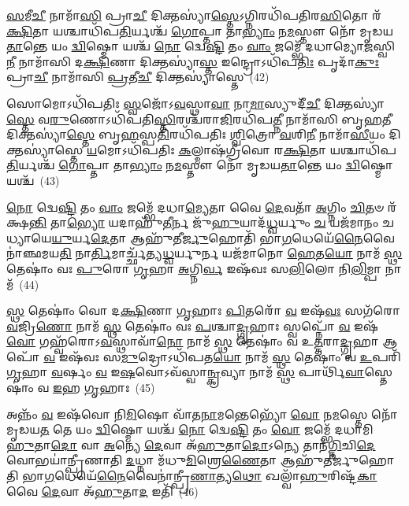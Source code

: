 {\anuvakamend[{\-\ul{𑌦𑍁}\-𑌧𑍍𑌰\-\ul{𑌸𑍍𑌤}\-𑌨𑍂𑌰𑍍\mbox{}\-\ul{𑌹}\-𑌵𑌿𑌰𑍍𑌭𑌾᳴𑌗𑌾𑌃 𑌪𑌾\-\ul{𑌤𑍁} 𑌦𑍍𑌵𑌾𑌤𑍍𑌰𑌿𑍞᳴𑌶𑌚𑍍𑌚}]}%

\-\ul{𑌸}\-𑌮𑍀\-\ul{𑌚𑍀} 𑌨𑌾𑌮𑌾᳴\-\ul{𑌸𑌿} 𑌪𑍍𑌰𑌾\-\ul{𑌚𑍀} 𑌦𑌿𑌕𑍍𑌤𑌸𑍍𑌯𑌾॑\-\ul{𑌸𑍍𑌤𑍇}\-\-𑌽𑌗𑍍𑌨𑌿𑌰𑌧𑌿᳴𑌪𑌤𑌿𑌰\-\ul{𑌸𑌿}\-𑌤𑍋 𑌰᳴\-\ul{𑌕𑍍𑌷𑌿}\-𑌤𑌾 𑌯𑌶𑍍𑌚𑌾𑌧𑌿᳴𑌪\-\ul{𑌤𑌿}\-𑌰𑍍𑌯𑌶𑍍𑌚᳴ \ul{𑌗𑍋}\-𑌪𑍍𑌤𑌾 𑌤𑌾\-\ul{𑌭𑍍𑌯𑌾𑌂} 𑌨\-\ul{𑌮}\-𑌸𑍍𑌤𑍗 𑌨𑍋᳴ 𑌮𑍃𑌡𑌯\-\ul{𑌤𑌾}\-𑌨𑍍𑌤𑍇 𑌯𑌂 \ul{𑌦𑍍𑌵𑌿}\-𑌷𑍍𑌮𑍋 𑌯𑌶𑍍𑌚᳴ \ul{𑌨𑍋} 𑌦𑍍𑌵𑍇\-\ul{𑌷𑍍𑌟𑌿} 𑌤𑌂 \ul{𑌵𑌾𑌂} 𑌜𑌮𑍍𑌭𑍇᳴ 𑌦𑌧𑌾𑌮𑍍𑌯𑍋\-\ul{𑌜}\-𑌸𑍍𑌵𑌿\-\ul{𑌨𑍀} 𑌨𑌾𑌮𑌾᳴𑌸𑌿 𑌦\-\ul{𑌕𑍍𑌷𑌿}\-𑌣𑌾 𑌦𑌿𑌕𑍍𑌤𑌸𑍍𑌯𑌾॑\-\ul{𑌸𑍍𑌤} 𑌇𑌨𑍍𑌦𑍍𑌰𑍋\-𑌽𑌧𑌿᳴𑌪\-\ul{𑌤𑌿𑌃} 𑌪𑍃𑌦𑌾᳴\-\ul{𑌕𑍁𑌃} 𑌪𑍍𑌰𑌾\-\ul{𑌚𑍀} 𑌨𑌾𑌮𑌾᳴𑌸𑌿 \ul{𑌪𑍍𑌰}\-𑌤𑍀\-\ul{𑌚𑍀} 𑌦𑌿𑌕𑍍𑌤𑌸𑍍𑌯𑌾॑𑌸𑍍𑌤𑍇~(42)

𑌸𑍋𑌮𑍋\-𑌽𑌧𑌿᳴𑌪𑌤𑌿𑌃 \ul{𑌸𑍍𑌵}\-𑌜𑍋᳴\-𑌽\-\ul{𑌵}\-𑌸𑍍𑌥𑌾\-\ul{𑌵𑌾} 𑌨𑌾\-\ul{𑌮𑌾}\-𑌸𑍍𑌯𑍁𑌦𑍀᳴\-\ul{𑌚𑍀} 𑌦𑌿𑌕𑍍𑌤𑌸𑍍𑌯𑌾॑\-\ul{𑌸𑍍𑌤𑍇} 𑌵\-\ul{𑌰𑍁}\-𑌣𑍋\-𑌽𑌧𑌿᳴𑌪𑌤𑌿\-\ul{𑌸𑍍𑌤𑌿}\-𑌰𑌶𑍍𑌚᳴𑌰𑌾\-\ul{𑌜𑌿}\-𑌰𑌧𑌿᳴𑌪\-\ul{𑌤𑍍𑌨𑍀} 𑌨𑌾𑌮𑌾᳴𑌸𑌿 𑌬𑍃\-\ul{𑌹}\-𑌤𑍀 𑌦𑌿𑌕𑍍𑌤𑌸𑍍𑌯𑌾॑\-\ul{𑌸𑍍𑌤𑍇} 𑌬𑍃\-\ul{𑌹}\-𑌸𑍍𑌪\-\ul{𑌤𑌿}\-𑌰𑌧𑌿᳴𑌪𑌤𑌿𑌃 \ul{𑌶𑍍𑌵𑌿}\-𑌤𑍍𑌰𑍋 \ul{𑌵}\-𑌶𑌿\-\ul{𑌨𑍀} 𑌨𑌾𑌮𑌾᳴\-\ul{𑌸𑍀}\-𑌯𑌂 𑌦𑌿𑌕𑍍𑌤𑌸𑍍𑌯𑌾॑𑌸𑍍𑌤𑍇 \ul{𑌯}\-𑌮𑍋\-𑌽𑌧𑌿᳴𑌪𑌤𑌿𑌃 \ul{𑌕}\-𑌲𑍍𑌮𑌾𑌷᳴𑌗𑍍𑌰𑍀𑌵𑍋 𑌰\-\ul{𑌕𑍍𑌷𑌿}\-𑌤𑌾 𑌯𑌶𑍍𑌚𑌾𑌧𑌿᳴𑌪\-\ul{𑌤𑌿}\-𑌰𑍍𑌯𑌶𑍍𑌚᳴ \ul{𑌗𑍋}\-𑌪𑍍𑌤𑌾 𑌤𑌾\-\ul{𑌭𑍍𑌯𑌾𑌂} 𑌨\-\ul{𑌮}\-𑌸𑍍𑌤𑍗 𑌨𑍋᳴ 𑌮𑍃𑌡𑌯\-\ul{𑌤𑌾}\-𑌨𑍍𑌤𑍇 𑌯𑌂 \ul{𑌦𑍍𑌵𑌿}\-𑌷𑍍𑌮𑍋 𑌯𑌶𑍍𑌚᳴~(43)

\-\ul{𑌨𑍋} 𑌦𑍍𑌵𑍇\-\ul{𑌷𑍍𑌟𑌿} 𑌤𑌂 \ul{𑌵𑌾𑌂} 𑌜𑌮𑍍𑌭𑍇᳴ 𑌦𑌧𑌾\-\ul{𑌮𑍍𑌯𑍇}\-𑌤𑌾 𑌵𑍈 \ul{𑌦𑍇}\-𑌵𑌤𑌾᳴ \ul{𑌅}\-𑌗𑍍𑌨𑌿𑌂 \ul{𑌚𑌿}\-𑌤𑍞 𑌰᳴𑌕𑍍𑌷\-\ul{𑌨𑍍𑌤𑌿} 𑌤𑌾\-\ul{𑌭𑍍𑌯𑍋} 𑌯𑌦𑌾𑌹𑍁᳴\-\ul{𑌤𑍀}\-𑌰𑍍𑌨 𑌜𑍁᳴\-\ul{𑌹𑍁}\-𑌯𑌾𑌦᳴\-\ul{𑌧𑍍𑌵}\-𑌰𑍍𑌯𑍁𑌂 \ul{𑌚} 𑌯𑌜᳴𑌮𑌾𑌨𑌂 𑌚 𑌧𑍍𑌯𑌾𑌯𑍇\-\ul{𑌯𑍁}\-𑌰𑍍𑌯\-\ul{𑌦𑍇}\-𑌤𑌾 𑌆𑌹𑍁᳴𑌤𑍀\-\ul{𑌰𑍍𑌜𑍁}\-𑌹𑍋𑌤𑌿᳴ 𑌭𑌾\-\ul{𑌗}\-𑌧𑍇𑌯𑍇᳴\-\ul{𑌨𑍈}\-𑌵𑍈𑌨𑌾॑𑌞𑍍𑌛𑌮𑌯\-\ul{𑌤𑌿} 𑌨𑌾\-\ul{𑌰𑍍𑌤𑌿}\-𑌮𑌾𑌰𑍍𑌚𑍍𑌛᳴𑌤𑍍𑌯\-\ul{𑌧𑍍𑌵}\-𑌰𑍍𑌯𑍁𑌰𑍍𑌨 𑌯𑌜᳴𑌮𑌾𑌨𑍋 \ul{𑌹𑍇}\-𑌤\-\ul{𑌯𑍋} 𑌨𑌾𑌮᳴ \ul{𑌸𑍍𑌥} 𑌤𑍇𑌷𑌾𑌂॑ 𑌵𑌃 \ul{𑌪𑍁}\-𑌰𑍋 \ul{𑌗𑍃}\-𑌹𑌾 \ul{𑌅}\-𑌗𑍍𑌨𑌿\-\ul{𑌰𑍍𑌵} 𑌇𑌷᳴𑌵𑌃 𑌸\-\ul{𑌲𑌿}\-𑌲𑍋 𑌨𑌿\-\ul{𑌲𑌿}\-𑌮𑍍𑌪𑌾 𑌨𑌾𑌮᳴~(44)

\-\ul{𑌸𑍍𑌥} 𑌤𑍇𑌷𑌾𑌂॑ 𑌵𑍋 𑌦\-\ul{𑌕𑍍𑌷𑌿}\-𑌣𑌾 \ul{𑌗𑍃}\-𑌹𑌾𑌃 \ul{𑌪𑌿}\-𑌤𑌰𑍋᳴ \ul{𑌵} 𑌇𑌷᳴\-\ul{𑌵𑌃} 𑌸𑌗᳴𑌰𑍋 \ul{𑌵}\-𑌜𑍍𑌰𑌿\-\ul{𑌣𑍋} 𑌨𑌾𑌮᳴ \ul{𑌸𑍍𑌥} 𑌤𑍇𑌷𑌾𑌂॑ 𑌵𑌃 \ul{𑌪}\-𑌶𑍍𑌚𑌾\-\ul{𑌦𑍍𑌗𑍃}\-𑌹𑌾𑌃 𑌸𑍍𑌵𑌪𑍍𑌨𑍋᳴ \ul{𑌵} 𑌇𑌷᳴\-\ul{𑌵𑍋} 𑌗𑌹𑍍𑌵᳴𑌰𑍋\-𑌽\-\ul{𑌵}\-𑌸𑍍𑌥𑌾𑌵𑌾᳴\-\ul{𑌨𑍋} 𑌨𑌾𑌮᳴ \ul{𑌸𑍍𑌥} 𑌤𑍇𑌷𑌾𑌂॑ 𑌵 𑌉\-\ul{𑌤𑍍𑌤}\-𑌰𑌾\-\ul{𑌦𑍍𑌗𑍃}\-𑌹𑌾 𑌆𑌪𑍋᳴ \ul{𑌵} 𑌇𑌷᳴𑌵𑌃 𑌸\-\ul{𑌮𑍁}\-𑌦𑍍𑌰𑍋\-𑌽𑌧𑌿᳴𑌪𑌤\-\ul{𑌯𑍋} 𑌨𑌾𑌮᳴ \ul{𑌸𑍍𑌥} 𑌤𑍇𑌷𑌾𑌂॑ 𑌵 \ul{𑌉}\-𑌪𑌰𑌿᳴ \ul{𑌗𑍃}\-𑌹𑌾 \ul{𑌵}\-𑌰𑍍\mbox{}𑌷𑌂 \ul{𑌵} 𑌇\-\ul{𑌷}\-𑌵𑍋\-𑌽𑌵᳴𑌸𑍍𑌵𑌾\-\ul{𑌨𑍍𑌕𑍍𑌰}\-𑌵𑍍𑌯𑌾 𑌨𑌾𑌮᳴ \ul{𑌸𑍍𑌥} 𑌪𑌾𑌰𑍍𑌥𑌿᳴\-\ul{𑌵𑌾}\-𑌸𑍍𑌤𑍇𑌷𑌾𑌂॑ 𑌵 \ul{𑌇}\-𑌹 \ul{𑌗𑍃}\-𑌹𑌾𑌃~(45)

𑌅𑌨𑍍𑌨𑌂᳴ \ul{𑌵} 𑌇𑌷᳴𑌵𑍋 𑌨𑌿\-\ul{𑌮𑌿}\-𑌷𑍋 𑌵𑌾᳴𑌤\-\ul{𑌨𑌾}\-𑌮𑌨𑍍𑌤𑍇𑌭𑍍𑌯𑍋᳴ \ul{𑌵𑍋} 𑌨\-\ul{𑌮}\-𑌸𑍍𑌤𑍇 𑌨𑍋᳴ 𑌮𑍃𑌡𑌯\-\ul{𑌤} 𑌤𑍇 𑌯𑌂 \ul{𑌦𑍍𑌵𑌿}\-𑌷𑍍𑌮𑍋 𑌯𑌶𑍍𑌚᳴ \ul{𑌨𑍋} 𑌦𑍍𑌵𑍇\-\ul{𑌷𑍍𑌟𑌿} 𑌤𑌂 \ul{𑌵𑍋} 𑌜𑌮𑍍𑌭𑍇᳴ 𑌦𑌧𑌾𑌮𑌿 \ul{𑌹𑍁}\-𑌤𑌾\-\ul{𑌦𑍋} 𑌵𑌾 \ul{𑌅}\-𑌨𑍍𑌯𑍇 \ul{𑌦𑍇}\-𑌵𑌾 𑌅᳴\-\ul{𑌹𑍁}\-𑌤𑌾\-\ul{𑌦𑍋}\-\-𑌽𑌨𑍍𑌯𑍇 𑌤𑌾𑌨᳴\-\ul{𑌗𑍍𑌨𑌿}\-𑌚𑌿\-\ul{𑌦𑍇}\-𑌵𑍋𑌭𑌯𑌾॑𑌨𑍍𑌪𑍍𑌰𑍀𑌣𑌾𑌤𑌿 \ul{𑌦}\-𑌧𑍍𑌨𑌾 𑌮᳴𑌧𑍁\-\ul{𑌮𑌿}\-𑌶𑍍𑌰𑍇\-\ul{𑌣𑍈}\-𑌤𑌾 𑌆𑌹𑍁᳴𑌤𑍀𑌰𑍍𑌜𑍁𑌹𑍋𑌤𑌿 𑌭𑌾\-\ul{𑌗}\-𑌧𑍇𑌯𑍇᳴\-\ul{𑌨𑍈}\-𑌵𑍈𑌨𑌾॑𑌨𑍍𑌪𑍍𑌰𑍀\-\ul{𑌣𑌾}\-𑌤𑍍𑌯\-\ul{𑌥𑍋} 𑌖𑌲𑍍𑌵𑌾᳴\-\ul{𑌹𑍁}\-𑌰𑌿𑌷𑍍𑌟᳴\-\ul{𑌕𑌾} 𑌵𑍈 \ul{𑌦𑍇}\-𑌵𑌾 𑌅᳴\-\ul{𑌹𑍁}\-𑌤𑌾\-\ul{𑌦} 𑌇𑌤𑌿᳴~(46)

